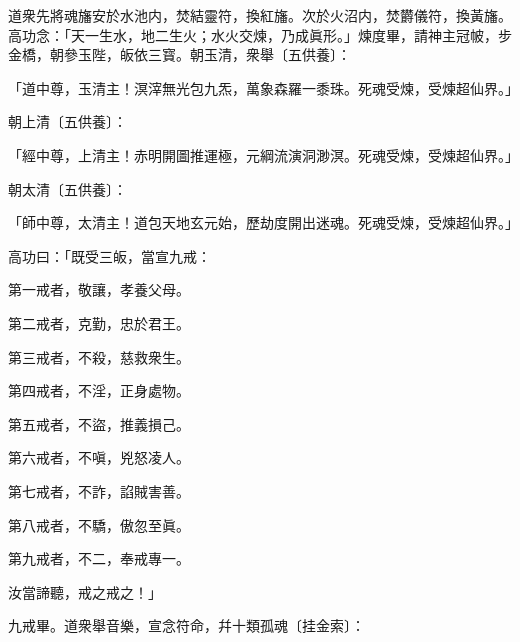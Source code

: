 道衆先將魂旛安於水池内，焚結靈符，換紅旛。次於火沼内，焚欝儀符，換黃旛。高功念：「天一生水，地二生火；水火交煉，乃成眞形。」煉度畢，請神主冠帔，步金橋，朝參玉陛，皈依三寳。朝玉清，衆舉〔五供養〕：

\begin{myquote}
「道中尊，玉清主！溟滓無光包九炁，萬象森羅一黍珠。死魂受煉，受煉超仙界。」
\end{myquote}

朝上清〔五供養〕：

\begin{myquote}
「經中尊，上清主！赤明開圖推運極，元綱流演洞渺溟。死魂受煉，受煉超仙界。」
\end{myquote}

朝太清〔五供養〕：

\begin{myquote}
「師中尊，太清主！道包天地玄元始，歷劫度開出迷魂。死魂受煉，受煉超仙界。」
\end{myquote}

高功曰：「既受三皈，當宣九戒：

\begin{myquote}
第一戒者，敬讓，孝養父母。

第二戒者，克勤，忠於君王。

第三戒者，不殺，慈救衆生。

第四戒者，不淫，正身處物。

第五戒者，不盜，推義損己。

第六戒者，不嗔，兇怒凌人。

第七戒者，不詐，諂賊害善。

第八戒者，不驕，傲忽至眞。

第九戒者，不二，奉戒專一。

汝當諦聽，戒之戒之！」
\end{myquote}

九戒畢。道衆舉音樂，宣念符命，幷十類孤魂〔挂金索〕：


